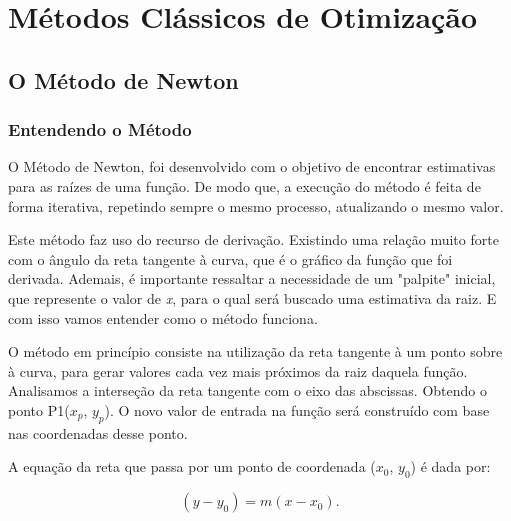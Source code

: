 

\chapter{\Large{Métodos Clássicos de Otimização}}\label{chp:2}


\section{{O Método de Newton}}


\subsection{Entendendo o Método}

\hspace{0.8cm}
O Método de Newton, foi desenvolvido com o objetivo de encontrar estimativas
para as raízes de uma função. De modo que, a execução do método é feita de
forma iterativa, repetindo sempre o mesmo processo, atualizando o mesmo valor.

Este método faz uso do recurso de derivação. Existindo uma relação muito
forte com o ângulo da reta tangente à curva, que é o gráfico da função que
foi derivada. Ademais, é importante ressaltar a necessidade de um "palpite"
inicial, que represente o valor de \textit{x}, para o qual será buscado uma
estimativa da raiz. E com isso vamos entender como o método funciona.

O método em princípio consiste na utilização da reta tangente à um
ponto sobre à curva, para gerar valores cada vez mais próximos da raiz
daquela função. Analisamos a interseção da reta tangente com o eixo das
abscissas. Obtendo o ponto P1($x_p$, $y_p$). O novo valor de entrada na função
será construído com base nas coordenadas desse ponto.

A equação da reta que passa por um ponto de coordenada ($x_0$, $y_0$) é dada
por:

\begin{equation}
    (y - y_0) = m(x - x_0).
\end{equation}

